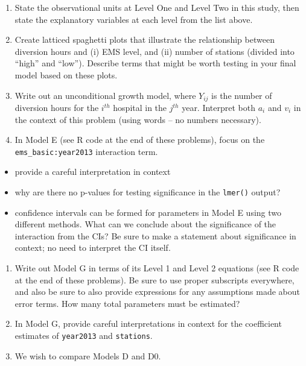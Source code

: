 \documentclass[
]{krantz}
\providecommand{\tightlist}{%
  \setlength{\itemsep}{0pt}\setlength{\parskip}{0pt}}
\begin{document}
\begin{enumerate}
  \begin{enumerate}
  \def\labelenumii{\alph{enumii}.}
  \item
    State the observational units at Level One and Level Two in this study, then state the explanatory variables at each level from the list above.
  \item
    Create latticed spaghetti plots that illustrate the relationship between diversion hours and (i) EMS level, and (ii) number of stations (divided into ``high'' and ``low''). Describe terms that might be worth testing in your final model based on these plots.
  \item
    Write out an unconditional growth model, where \(Y_{ij}\) is the number of diversion hours for the \(i^{th}\) hospital in the \(j^{th}\) year. Interpret both \(a_i\) and \(v_i\) in the context of this problem (using words -- no numbers necessary).
  \item
    In Model E (see R code at the end of these problems), focus on the \texttt{ems\_basic:year2013} interaction term.
  \end{enumerate}

  \begin{itemize}
  \tightlist
  \item
    provide a careful interpretation in context
  \item
    why are there no p-values for testing significance in the \texttt{lmer()} output?
  \item
    confidence intervals can be formed for parameters in Model E using two different methods. What can we conclude about the significance of the interaction from the CIs? Be sure to make a statement about significance in context; no need to interpret the CI itself.
  \end{itemize}

  \begin{enumerate}
  \def\labelenumii{\alph{enumii}.}
  \setcounter{enumii}{4}
  \item
    Write out Model G in terms of its Level 1 and Level 2 equations (see R code at the end of these problems). Be sure to use proper subscripts everywhere, and also be sure to also provide expressions for any assumptions made about error terms. How many total parameters must be estimated?
  \item
    In Model G, provide careful interpretations in context for the coefficient estimates of \texttt{year2013} and \texttt{stations}.
  \item
    We wish to compare Models D and D0.
  \end{enumerate}


\end{enumerate}
\end{document}
